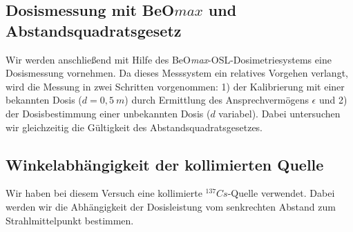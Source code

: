 \subsection{Dosismessung mit BeO$max$ und Abstandsquadratsgesetz}
Wir werden anschließend mit Hilfe des BeO\textit{max}-OSL-Dosimetriesystems eine Dosismessung vornehmen. Da dieses Messsystem ein relatives Vorgehen verlangt, wird die Messung in zwei Schritten vorgenommen: 1) der Kalibrierung mit einer bekannten Dosis ($d=0,5\ \unit{m}$) durch Ermittlung des Ansprechvermögens $\epsilon$ und 2) der Dosisbestimmung einer unbekannten Dosis ($d$ variabel). Dabei untersuchen wir gleichzeitig die Gültigkeit des Abstandsquadratsgesetzes.

\subsection{Winkelabhängigkeit der kollimierten Quelle}
Wir haben bei diesem Versuch eine kollimierte $^{137}Cs$-Quelle verwendet. Dabei werden wir die Abhängigkeit der Dosisleistung vom senkrechten Abstand zum Strahlmittelpunkt bestimmen.
